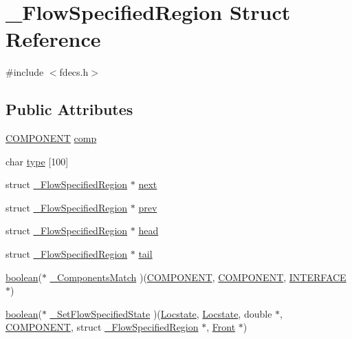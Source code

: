 \hypertarget{struct___flow_specified_region}{}\section{\+\_\+\+Flow\+Specified\+Region Struct Reference}
\label{struct___flow_specified_region}


{\ttfamily \#include $<$fdecs.\+h$>$}

\subsection*{Public Attributes}
\begin{DoxyCompactItemize}
\item 
\hyperlink{int_8h_a2bb7be12ca59ea6443c8757df0a7c278}{C\+O\+M\+P\+O\+N\+E\+NT} \hyperlink{struct___flow_specified_region_a5fce4f0a8a05cf23a93104d0c7580d00}{comp}
\item 
char \hyperlink{struct___flow_specified_region_a67b785a9f602ba9ff1ef48c6ed4a48c0}{type} \mbox{[}100\mbox{]}
\item 
struct \hyperlink{struct___flow_specified_region}{\+\_\+\+Flow\+Specified\+Region} $\ast$ \hyperlink{struct___flow_specified_region_a6498b836807b6b21689af01da4af0439}{next}
\item 
struct \hyperlink{struct___flow_specified_region}{\+\_\+\+Flow\+Specified\+Region} $\ast$ \hyperlink{struct___flow_specified_region_a51ef4882bf1c349a6bc4a23c600ad0a4}{prev}
\item 
struct \hyperlink{struct___flow_specified_region}{\+\_\+\+Flow\+Specified\+Region} $\ast$ \hyperlink{struct___flow_specified_region_a5e51bd32d4a24a009f2361bfabe44cf4}{head}
\item 
struct \hyperlink{struct___flow_specified_region}{\+\_\+\+Flow\+Specified\+Region} $\ast$ \hyperlink{struct___flow_specified_region_a2a325be693b70780a41515fce2a235e9}{tail}
\item 
\hyperlink{cdecs_8h_ad048433382a936258fb49e2ec4f148e1}{boolean}($\ast$ \hyperlink{struct___flow_specified_region_a6566a46ef3bd72417e1fc7068285b124}{\+\_\+\+Components\+Match} )(\hyperlink{int_8h_a2bb7be12ca59ea6443c8757df0a7c278}{C\+O\+M\+P\+O\+N\+E\+NT}, \hyperlink{int_8h_a2bb7be12ca59ea6443c8757df0a7c278}{C\+O\+M\+P\+O\+N\+E\+NT}, \hyperlink{int_8h_a58cf562d0d320a608294b7310ea167dc}{I\+N\+T\+E\+R\+F\+A\+CE} $\ast$)
\item 
\hyperlink{cdecs_8h_ad048433382a936258fb49e2ec4f148e1}{boolean}($\ast$ \hyperlink{struct___flow_specified_region_ac64cd108cfd301ac1a19a6d9cc7bb312}{\+\_\+\+Set\+Flow\+Specified\+State} )(\hyperlink{fdecs_8h_ace3c795e1cf7a6b6e5444944f0b59bcd}{Locstate}, \hyperlink{fdecs_8h_ace3c795e1cf7a6b6e5444944f0b59bcd}{Locstate}, double $\ast$, \hyperlink{int_8h_a2bb7be12ca59ea6443c8757df0a7c278}{C\+O\+M\+P\+O\+N\+E\+NT}, struct \hyperlink{struct___flow_specified_region}{\+\_\+\+Flow\+Specified\+Region} $\ast$, \hyperlink{fdecs_8h_ac32202b798f848095c489cfd04c4ca5f}{Front} $\ast$)

\end{DoxyCompactItemize}
